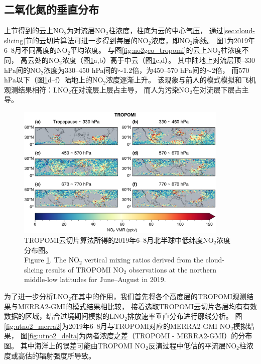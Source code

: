 \subsection{二氧化氮的垂直分布} \label{sec:no2_profile}


上节得到的云上NO$_2$为对流层NO$_2$柱浓度，柱底为云的中心气压，
通过\ref{sec:cloud-slicing}节的云切片算法可进一步得到每层的NO$_2$浓度，即NO$_2$廓线。
图\ref{fig:utno2_tropomi}为2019年6--8月不同高度的NO$_2$平均浓度。
与图\ref{fig:no2geo_tropomi}的云上NO$_2$柱浓度不同，
高云处的NO$_2$浓度（图\ref{fig:utno2_tropomi}a,b）高于中云（图\ref{fig:utno2_tropomi}c,d）。
其中陆地上对流层顶--330 hPa间的NO$_2$浓度为330--450 hPa间的$\sim$1.2倍，为450--570 hPa间的$\sim$2倍，
而570 hPa以下（图\ref{fig:utno2_tropomi}d--f）陆地上的NO$_2$浓度逐渐上升。
该现象与前人的模式模拟和飞机观测结果相符：LNO$_2$在对流层上层占主导，
而人为污染NO$_2$在对流层下层占主导\citep{Pickering.1996,Ott.2010,Laughner.2017}。


\begin{figure}[H]
    \centering
    \includegraphics[width=0.9\textwidth]{./figures/utno2_tropomi.png}
    \caption{
    TROPOMI云切片算法所得的2019年6--8月北半球中低纬度NO$_2$浓度分布图。 \\
    Figure \ref{fig:utno2_tropomi}. The NO$_2$ vertical mixing ratios derived from the cloud-slicing results of TROPOMI NO$_2$ observations at the northern middle-low latitudes for June--August in 2019.
    }
    \label{fig:utno2_tropomi}
\end{figure}

为了进一步分析LNO$_2$在其中的作用，我们首先将各个高度层的TROPOMI观测结果与MERRA2-GMI的模式结果相比较，
接着选取TROPOMI云切片各层均有有效数据的区域，结合过境期间模拟的LNO$_2$排放速率垂直分布进行廓线分析。
图\ref{fig:utno2_merra2}为2019年6--8月与TROPOMI对应的MERRA2-GMI NO$_2$模拟结果，
图\ref{fig:utno2_delta}为两者浓度之差（TROPOMI - MERRA2-GMI）的分布图。
其中海洋上的误差可能由TROPOMI NO$_2$反演过程中低估的平流层NO$_2$柱浓度或高估的辐射强度所导致\citep{VanGeffen.2020}。

